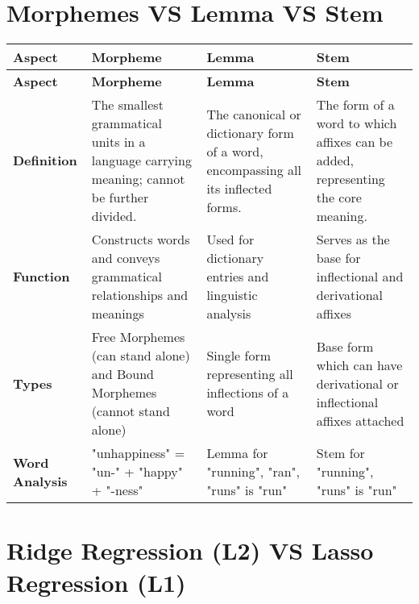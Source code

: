 
\section{Morphemes VS Lemma VS Stem \cite{chatgpt}} \label{Morphemes VS Lemma VS Stem}

\begin{longtable}{|p{2.5cm}|p{4cm}|p{4cm}|p{4cm}|}
    \hline
    \textbf{Aspect} & \textbf{Morpheme} & \textbf{Lemma} & \textbf{Stem} \\
    \hline
    \endfirsthead

    \hline
    \textbf{Aspect} & \textbf{Morpheme} & \textbf{Lemma} & \textbf{Stem} \\
    \hline
    \endhead

    \hline\endfoot
    \hline\endlastfoot

    \textbf{Definition} & The smallest grammatical units in a language carrying meaning; cannot be further divided. & The canonical or dictionary form of a word, encompassing all its inflected forms. & The form of a word to which affixes can be added, representing the core meaning. \\
    \hline

    \textbf{Function} & Constructs words and conveys grammatical relationships and meanings & Used for dictionary entries and linguistic analysis & Serves as the base for inflectional and derivational affixes \\
    \hline

    \textbf{Types} & Free Morphemes (can stand alone) and Bound Morphemes (cannot stand alone) & Single form representing all inflections of a word & Base form which can have derivational or inflectional affixes attached\\
    \hline

    \textbf{Word Analysis} & "unhappiness" = "un-" + "happy" + "-ness" & Lemma for "running", "ran", "runs" is "run" & Stem for "running", "runs" is "run" \\
    \hline
\end{longtable}



\section{Ridge Regression (L2) VS Lasso Regression (L1)}\label{Ridge Regression VS Lasso Regression}

